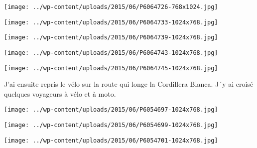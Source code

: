  

 

\begin{center} \texttt{[image: ../wp-content/uploads/2015/06/P6064726-768x1024.jpg]} \end{center}

 

 

\begin{center} \texttt{[image: ../wp-content/uploads/2015/06/P6064733-1024x768.jpg]} \end{center}

 

 

\begin{center} \texttt{[image: ../wp-content/uploads/2015/06/P6064739-1024x768.jpg]} \end{center}

 

 

\begin{center} \texttt{[image: ../wp-content/uploads/2015/06/P6064743-1024x768.jpg]} \end{center}

 

 

\begin{center} \texttt{[image: ../wp-content/uploads/2015/06/P6064745-1024x768.jpg]} \end{center}

 

 J'ai ensuite repris le vélo sur la route qui longe la Cordillera Blanca. J´y ai croisé quelques voyageurs à vélo et à moto. 

 

\begin{center} \texttt{[image: ../wp-content/uploads/2015/06/P6054697-1024x768.jpg]} \end{center}

 

 

\begin{center} \texttt{[image: ../wp-content/uploads/2015/06/P6054699-1024x768.jpg]} \end{center}

 

 

\begin{center} \texttt{[image: ../wp-content/uploads/2015/06/P6054701-1024x768.jpg]} \end{center}

